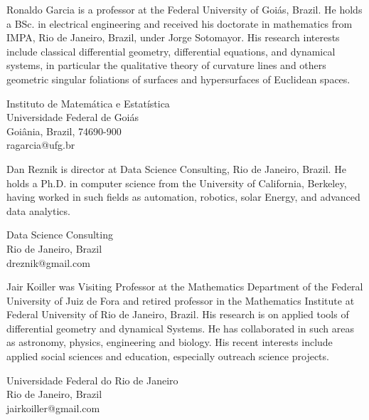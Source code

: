 \begin{biog}

\item[Ronaldo Garcia] is a professor at the Federal University of Goiás, Brazil. He holds a BSc. in electrical engineering and received his doctorate in mathematics from IMPA, Rio de Janeiro, Brazil, under Jorge Sotomayor. His research interests include classical differential geometry, differential equations, and dynamical systems, in particular the qualitative theory of curvature lines and others geometric singular foliations of surfaces and hypersurfaces of Euclidean spaces.
\begin{affil}
Instituto de Matemática e Estatística\\
Universidade Federal de Goiás\\
Goiânia, Brazil, 74690-900\\
{ragarcia@ufg.br}
\end{affil}

\item[Dan Reznik] is director at Data Science Consulting, Rio de Janeiro, Brazil. He holds a Ph.D. in computer science from the University of California, Berkeley, having worked in such fields as automation, robotics, solar Energy, and advanced data analytics.
\begin{affil}
Data Science Consulting\\
Rio de Janeiro, Brazil\\
{dreznik@gmail.com}
\end{affil}

\item[Jair Koiller] was Visiting Professor at the Mathematics Department of the Federal University of Juiz de Fora and retired professor in the Mathematics Institute at Federal University of Rio de Janeiro, Brazil. His research is on applied tools of differential geometry and dynamical Systems. He has collaborated in such areas as astronomy, physics, engineering and biology. His recent interests include applied social sciences and education, especially outreach science projects.

\begin{affil}
Universidade Federal do Rio de Janeiro\\
Rio de Janeiro, Brazil\\
{jairkoiller@gmail.com}
\end{affil}
\end{biog}